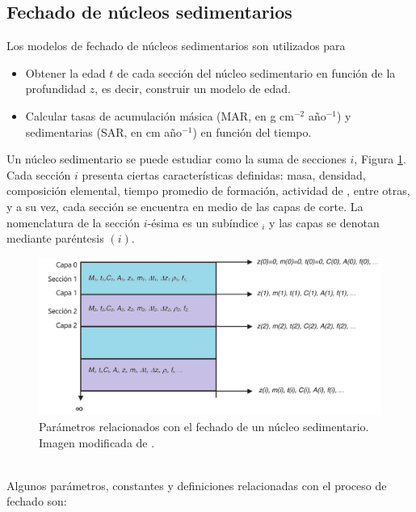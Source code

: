 	\subsection{Fechado de núcleos sedimentarios}\label{SubSec-Fechado}
Los modelos de fechado de núcleos sedimentarios son utilizados para \cite{SANCHEZCABEZA2012183}
\begin{itemize}
\item Obtener la edad $t$ de cada sección del núcleo sedimentario en función de la profundidad $z$, es decir, construir un modelo de edad.
\item Calcular tasas de acumulación másica (MAR, en g cm$^{-2}$ año$^{-1}$) y sedimentarias (SAR, en cm año$^{-1}$) en función del tiempo.
\end{itemize}	
Un núcleo sedimentario se puede estudiar como la suma de secciones $i$, Figura \ref{Fig-EsquemaNucleoSed}. Cada sección $i$ presenta ciertas características definidas: masa, densidad, composición elemental, tiempo promedio de formación, actividad de \PbCero, entre otras, y a su vez, cada sección se encuentra en medio de las capas de corte. La nomenclatura de la sección $i$-ésima es un subíndice $_i$ y las capas se denotan mediante paréntesis $(i)$. 
\begin{figure}[h]
 \centering
 \includegraphics[width=\textwidth]{Imagenes/EsquemaNucleoSed-3.png}
 \caption{Parámetros relacionados con el fechado de un núcleo sedimentario. Imagen modificada de \cite{SANCHEZCABEZA2012183}.}\label{Fig-EsquemaNucleoSed}
\end{figure}	
\\ Algunos parámetros, constantes y definiciones relacionadas con el proceso de fechado son:
